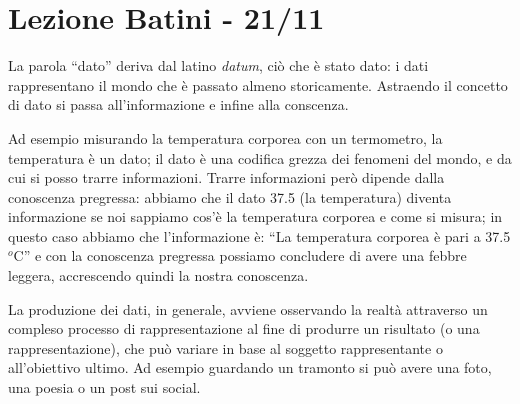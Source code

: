 \documentclass[a4page, 11pt]{article}
\begin{document}
\section*{Lezione Batini - 21/11}
La parola ``dato'' deriva dal latino \textit{datum}, ciò che è stato dato: i dati rappresentano il mondo che è passato almeno storicamente.
Astraendo il concetto di dato si passa all'informazione e infine alla conscenza.

Ad esempio misurando la temperatura corporea con un termometro, la temperatura è un dato; il dato è una codifica grezza dei fenomeni del mondo, e da cui si posso trarre informazioni.
Trarre informazioni però dipende dalla conoscenza pregressa: abbiamo che il dato 37.5 (la temperatura) diventa informazione se noi sappiamo cos'è la temperatura corporea e come si misura; in questo caso abbiamo che l'informazione è: ``La temperatura corporea è pari a 37.5 $^o$C'' e con la conoscenza pregressa possiamo concludere di avere una febbre leggera, accrescendo quindi la nostra conoscenza.

La produzione dei dati, in generale, avviene osservando la realtà attraverso un compleso processo di rappresentazione al fine di produrre un risultato (o una rappresentazione), che può variare in base al soggetto rappresentante o all'obiettivo ultimo.
Ad esempio guardando un tramonto si può avere una foto, una poesia o un post sui social.
\end{document}
